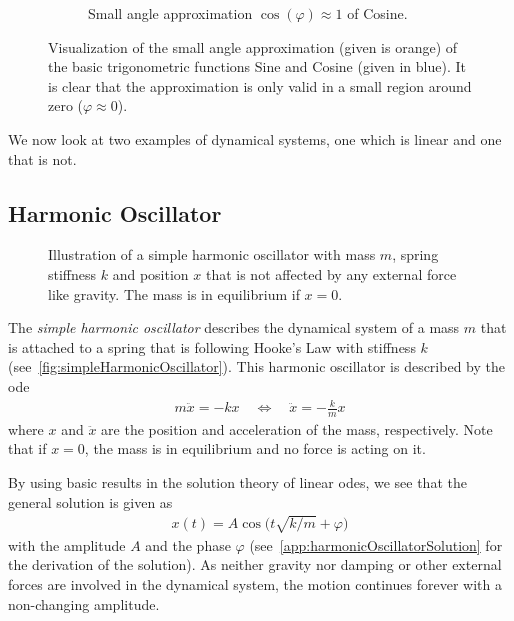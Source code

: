 \begin{figure}
\begin{subfigure}[t]{0.5\linewidth}
				\caption{Small angle approximation \( \cos(\varphi) \approx 1 \) of Cosine.}
			\end{subfigure}
			\caption{Visualization of the small angle approximation (given is orange) of the basic trigonometric functions Sine and Cosine (given in blue). It is clear that the approximation is only valid in a small region around zero (\( \varphi \approx 0 \)).}
			\label{fig:smallAngleApproximation}
		\end{figure}

		We now look at two examples of dynamical systems, one which is linear and one that is not.

		\subsection{Harmonic Oscillator}
			\label{subsec:harmonicOscillator}

			\begin{figure}
				\centering
				\tikzHarmonicOscillator
				\caption{Illustration of a simple harmonic oscillator with mass \(m\), spring stiffness \(k\) and position \(x\) that is not affected by any external force like gravity. The mass is in equilibrium if \( x = 0 \).}
				\label{fig:simpleHarmonicOscillator}
			\end{figure}

			The \emph{simple harmonic oscillator} describes the dynamical system of a mass \(m\) that is attached to a spring that is following Hooke's Law with stiffness \(k\) (see~\autoref{fig:simpleHarmonicOscillator}). This harmonic oscillator is described by the \ac{ode}
			\begin{align}
				m\ddot{x} = -kx \quad\iff\quad \ddot{x} = -\frac{k}{m} x  \label{eq:harmonicOscillator}
			\end{align}
			where \(x\) and \(\ddot{x}\) are the position and acceleration of the mass, respectively. Note that if \( x = 0 \), the mass is in equilibrium and no force is acting on it.

			By using basic results in the solution theory of linear \acp{ode}, we see that the general solution is given as
			\begin{align*}
				x(t) = A \cos\Big(t \sqrt{k / m} + \varphi\Big)
			\end{align*}
			with the amplitude \(A\) and the phase \(\varphi\) (see~\autoref{app:harmonicOscillatorSolution} for the derivation of the solution). As neither gravity nor damping or other external forces are involved in the dynamical system, the motion continues forever with a non-changing amplitude.

